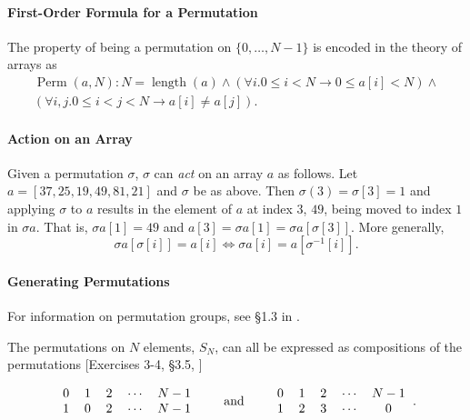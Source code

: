 \documentclass{llncs}
\DeclareMathOperator{\Perm}{Perm}
\DeclareMathOperator{\len}{length}
\begin{document}
\paragraph{First-Order Formula for a Permutation}
The property of being a permutation on \(\{0, \dotsc, N-1\}\) is encoded in the theory of arrays as
\begin{multline*}\Perm(a, N): N = \len(a) \wedge (\forall i. 0 \leq i < N \rightarrow 0 \leq a[i] < N) \wedge\\(\forall i,j. 0 \leq i < j < N \rightarrow a[i] \not= a[j]).\end{multline*}

\paragraph{Action on an Array}

Given a permutation \(\sigma\), \(\sigma\) can {\it act} on an array \(a\) as follows.  Let \(a = [37, 25, 19, 49, 81, 21]\) and \(\sigma\) be as above.  Then \(\sigma(3) = \sigma[3] = 1\) and applying \(\sigma\) to \(a\) results in the element of \(a\) at index \(3\), \(49\), being moved to index \(1\) in \(\sigma a\).  That is, \(\sigma a[1] = 49\) and \(a[3] = \sigma a[1] = \sigma a[\sigma[3]]\).  More generally,
\[\sigma a[\sigma[i]] = a[i] \Longleftrightarrow \sigma a[i] = a[\sigma^{-1}[i]].\]

\paragraph{Generating Permutations}
For information on permutation groups, see \S1.3 in \cite{dummitfoote}.

\makeatletter
\renewcommand{\@cite}[1]{#1}
\makeatother
The permutations on \(N\) elements, \(S_{N}\), can all be expressed as compositions of the permutations [Exercises 3-4, \S3.5, \cite{dummitfoote}]

\[\begin{tabular}{ccccc}
0 & 1 & 2 & \(\dotsm\) & \(N-1\)\\
1 & 0 & 2 & \(\dotsm\) & \(N-1\)
\end{tabular}
\qquad\textrm{and}\qquad
\begin{tabular}{ccccc}
0 & 1 & 2 & \(\dotsm\) & \(N-1\)\\
1 & 2 & 3 & \(\dotsm\) & 0
\end{tabular}.\]
\makeatletter
\renewcommand{\@cite}[1]{[#1]}
\makeatother
\end{document}
